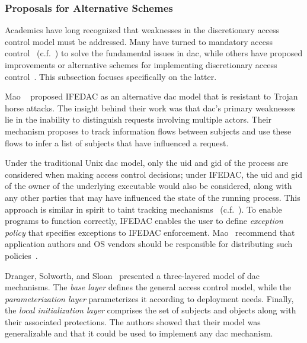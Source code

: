 \subsubsection*{Proposals for Alternative Schemes}

Academics have long recognized that weaknesses in the discretionary access control model
must be addressed. Many have turned to mandatory access control~
(c.f.~) to solve the fundamental issues in \gls{dac}, while others have
proposed improvements or alternative schemes for implementing discretionary access
control~\cite{mao2009_trojan_resistant_dac, solworth2004_layered_dac,
dranger2006_dac_complexity, dittmer2014_setuid, tsafrir2008_setuid, chen2002_setuid}. This
subsection focuses specifically on the latter.

Mao \etal~\cite{mao2009_trojan_resistant_dac} proposed IFEDAC as an alternative \gls{dac}
model that is resistant to Trojan horse attacks. The insight behind their work was that
\gls{dac}'s primary weaknesses lie in the inability to distinguish requests involving
multiple actors. Their mechanism proposes to track information flows between subjects and
use these flows to infer a list of subjects that have influenced a request.

Under the traditional Unix \gls{dac} model, only the \gls{uid} and \gls{gid} of the
process are considered when making access control decisions; under IFEDAC, the \gls{uid}
and \gls{gid} of the owner of the underlying executable would also be considered, along
with any other parties that may have influenced the state of the running process. This
approach is similar in spirit to taint tracking mechanisms~
(c.f.~). To enable programs to function correctly, IFEDAC enables
the user to define \textit{exception policy} that specifies exceptions to IFEDAC
enforcement. Mao \etal~recommend that application authors and OS vendors should be
responsible for distributing such policies~\cite{mao2009_trojan_resistant_dac}.

Dranger, Solworth, and Sloan~\cite{solworth2004_layered_dac, dranger2006_dac_complexity}
presented a three-layered model of \gls{dac} mechanisms. The \textit{base layer} defines
the general access control model, while the \textit{parameterization layer} parameterizes
it according to deployment needs.  Finally, the \textit{local initialization layer}
comprises the set of subjects and objects along with their associated protections. The
authors showed that their model was generalizable and that it could be used to implement
any \gls{dac} mechanism.

